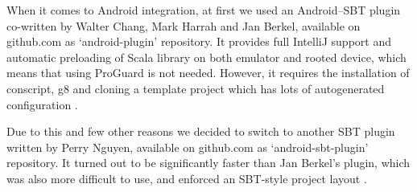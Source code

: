 When it comes to Android integration, at first we used an Android--SBT plugin co-written by Walter Chang, Mark Harrah and Jan Berkel, available on github.com as `android-plugin' repository. It provides full IntelliJ support and automatic preloading of Scala library on both emulator and rooted device, which means that using ProGuard is not needed. However, it requires the installation of conscript, g8 and cloning a template project which has lots of autogenerated configuration \cite{Nguyen:2013:differences}.

Due to this and few other reasons we decided to switch to another SBT plugin written by Perry Nguyen, available on github.com as `android-sbt-plugin' repository. It turned out to be significantly faster than Jan Berkel's plugin, which was also more difficult to use, and enforced an SBT-style project layout \cite{Nguyen:2013:differences}.






